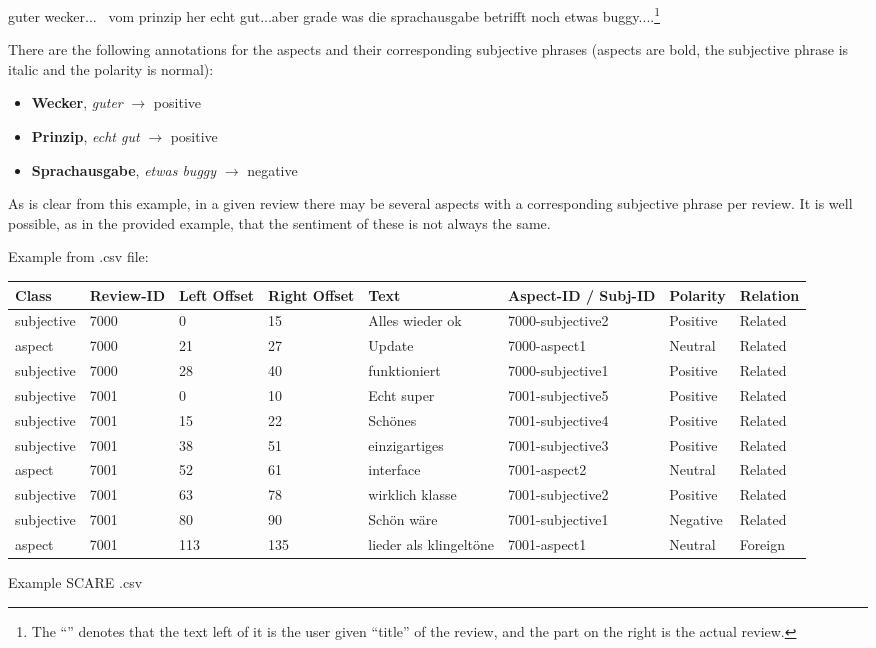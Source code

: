 \begin{examples}
	\label{ex:fine-grained-anno}
	\item guter wecker... \textbar\textbar\ vom prinzip her echt gut...aber grade was die sprachausgabe betrifft noch etwas buggy....\footnote{The ``\textbar\textbar'' denotes that the text left of it is the user given ``title'' of the review, and the part on the right is the actual review.}
\end{examples}

There are the following annotations for the aspects and their corresponding subjective phrases (aspects are bold, the subjective phrase is italic and the polarity is normal):


\begin{itemize}
	\item \textbf{Wecker}, \textit{guter} $\rightarrow$ positive
	\item \textbf{Prinzip}, \textit{echt gut} $\rightarrow$ positive
	\item \textbf{Sprachausgabe}, \textit{etwas buggy} $\rightarrow$ negative
\end{itemize}

As is clear from this example, in a given review there may be several aspects with a corresponding subjective phrase per review.
It is well possible, as in the provided example, that the sentiment of these is not always the same.

Example from .csv file:

{\begin{tabular}{llllllll}
	Class & Review-ID & Left Offset & Right Offset & Text & Aspect-ID / Subj-ID & Polarity & Relation  \\
	\hline
	subjective & 7000 & 0 & 15 & Alles wieder ok & 7000-subjective2 & Positive & Related \\
	aspect & 7000 & 21 & 27 & Update & 7000-aspect1 & Neutral & Related \\
	subjective & 7000 & 28 & 40 & funktioniert & 7000-subjective1 & Positive & Related \\
	subjective & 7001 & 0 & 10 & Echt super & 7001-subjective5 & Positive & Related \\
	subjective & 7001 & 15 & 22 & Schönes & 7001-subjective4 & Positive & Related \\
	subjective & 7001 & 38 & 51 & einzigartiges & 7001-subjective3 & Positive & Related \\
	aspect & 7001 & 52 & 61 & interface & 7001-aspect2 & Neutral & Related \\
	subjective & 7001 & 63 & 78 & wirklich klasse & 7001-subjective2 & Positive & Related \\
	subjective & 7001 & 80 & 90 & Schön wäre & 7001-subjective1 & Negative & Related \\
	aspect & 7001 & 113 & 135 & lieder als klingeltöne & 7001-aspect1 & Neutral & Foreign \\
\end{tabular}
}{Example SCARE .csv}


